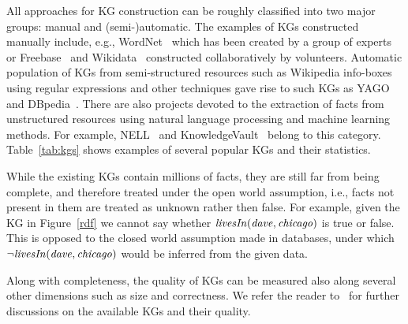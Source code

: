 All approaches for KG construction can be roughly classified into two major groups: manual and (semi-)automatic. The examples of KGs constructed manually include, e.g., WordNet~\cite{wordnet} which has been created by a group of experts or Freebase~\cite{Freebase} and Wikidata~\cite{wikidata} constructed collaboratively by volunteers. 
Automatic population of KGs from semi-structured resources such as Wikipedia info-boxes using regular expressions and other techniques gave rise to such KGs as YAGO~\cite{yago} and DBpedia~\cite{dbpedia}. %
There are also projects %
devoted to the extraction of facts from unstructured resources using natural language processing and machine learning methods. %
For example, NELL~\cite{nell} and KnowledgeVault~\cite{KnowledgeVault} belong to this category. Table~\ref{tab:kgs} shows examples of several popular KGs and their statistics. %


While the existing KGs contain millions of facts, they are still far from being complete, and therefore treated under the open world assumption, i.e., facts not present in them are treated as unknown rather then false. For example, given the KG in Figure~\ref{rdf} we cannot say whether $\mathit{livesIn(dave,chicago)}$ is true or false. This is opposed to the closed world assumption made in databases, under which $\mathit{\neg livesIn(dave,chicago)}$ would be inferred from the given data.

Along with completeness, the quality of KGs can  be %
measured also along several other dimensions such as size and correctness.  We refer the reader to~\cite{Nickel2015ARO,DBLP:journals/semweb/Paulheim17} for further discussions on the available KGs and their quality.





